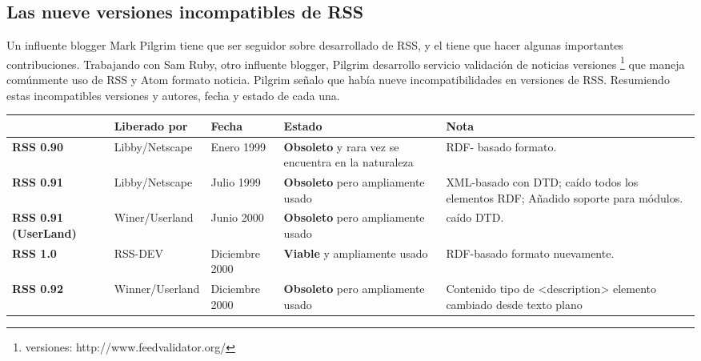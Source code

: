 \subsection{Las nueve versiones incompatibles de RSS}

Un influente blogger Mark Pilgrim tiene que ser seguidor sobre desarrollado de RSS,
y el tiene que hacer algunas importantes contribuciones. Trabajando con Sam Ruby,
otro influente blogger, Pilgrim desarrollo servicio validaci\'{o}n de noticias versiones
\footnote{versiones: http://www.feedvalidator.org/} que maneja com\'{u}nmente uso de RSS
y Atom formato noticia. Pilgrim se\~{n}alo que hab\'{i}a nueve incompatibilidades en
versiones de RSS. Resumiendo estas incompatibles versiones y autores, fecha y estado
de cada una.\cite{johnson2006rss}

\begin{minipage}[b]{\hsize}\centering

\begin{tabular}{>{\centering\arraybackslash}m{.05\linewidth} |>{\centering\arraybackslash}m{.17\linewidth}|>{\centering\arraybackslash}m{.1\linewidth}|>{\centering\arraybackslash}m{.2\linewidth}|>{\centering\arraybackslash}m{.4\linewidth}}

& \textbf{Liberado por} & \textbf{Fecha} & \textbf{Estado} & \textbf{Nota} \\
\hline

\textbf{RSS 0.90} & Libby/Netscape & Enero 1999 & \textbf{Obsoleto} y rara vez se encuentra en la naturaleza & RDF- basado formato. \\
\hline

\textbf{RSS 0.91 } & Libby/Netscape & Julio 1999 & \textbf{Obsoleto} pero ampliamente usado & XML-basado con DTD; caído todos los elementos RDF; Añadido soporte para módulos. \\
\hline 

\textbf{RSS 0.91 (UserLand) } & Winer/Userland & Junio 2000 & \textbf{Obsoleto} pero ampliamente usado & caído DTD. \\
\hline 

\textbf{RSS 1.0} & RSS-DEV & Diciembre 2000 & \textbf{Viable} y ampliamente usado & RDF-basado formato nuevamente.\\
\hline

\textbf{RSS 0.92} & Winner/Userland & Diciembre 2000 & \textbf{Obsoleto} pero ampliamente usado & Contenido tipo de <description> elemento cambiado desde texto plano\\
\hline


\end{tabular}
\end{minipage}

